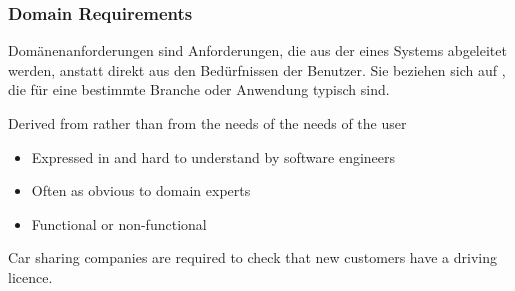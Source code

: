 \subsubsection{Domain Requirements}
\begin{infoBox}
    Domänenanforderungen sind Anforderungen, die aus der  eines Systems abgeleitet werden, anstatt direkt aus den Bedürfnissen der Benutzer. Sie beziehen sich auf , die für eine bestimmte Branche oder Anwendung typisch sind.
\end{infoBox}
\begin{defBox}[title=Domain Requirements]
    Derived from  rather than from the needs of the needs of the user
    \begin{itemize}
        \item Expressed in  and hard to understand by software engineers
        \item Often  as obvious to domain experts
        \item Functional or non-functional
    \end{itemize}
\end{defBox}
\begin{defBox}[title=Example]
    Car sharing companies are required to check that new customers have a driving licence.
\end{defBox}
